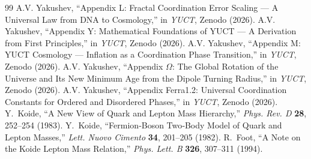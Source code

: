 \documentclass[12pt,a4paper]{article}
\begin{document}
	\begin{thebibliography}{99}
		 A.V. Yakushev, ``Appendix L: Fractal Coordination Error Scaling — A Universal Law from DNA to Cosmology,'' in \emph{YUCT}, Zenodo (2026).
		 A.V. Yakushev, ``Appendix Y: Mathematical Foundations of YUCT — A Derivation from First Principles,'' in \emph{YUCT}, Zenodo (2026).
		 A.V. Yakushev, ``Appendix M: YUCT Cosmology — Inflation as a Coordination Phase Transition,'' in \emph{YUCT}, Zenodo (2026).
		 A.V. Yakushev, ``Appendix \(\Omega\): The Global Rotation of the Universe and Its New Minimum Age from the Dipole Turning Radius,'' in \emph{YUCT}, Zenodo (2026).
		 A.V. Yakushev, ``Appendix Ferra1.2: Universal Coordination Constants for Ordered and Disordered Phases,'' in \emph{YUCT}, Zenodo (2026).
		 Y.~Koide, ``A New View of Quark and Lepton Mass Hierarchy,''
		\emph{Phys. Rev. D} \textbf{28}, 252--254 (1983).
		 Y.~Koide, ``Fermion‑Boson Two‑Body Model of Quark and Lepton Masses,''
		\emph{Lett. Nuovo Cimento} \textbf{34}, 201--205 (1982).
		 R.~Foot, ``A Note on the Koide Lepton Mass Relation,''
		\emph{Phys. Lett. B} \textbf{326}, 307--311 (1994).
	\end{thebibliography}
	
\end{document}
